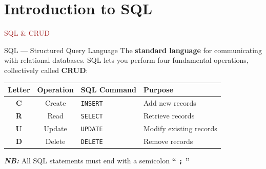 
\section{Introduction to SQL}

\begin{frame}{\textcolor{brown}{SQL \& CRUD}}
  \begin{block}{SQL — Structured Query Language}
    The \textbf{standard language} for communicating with relational databases.
    SQL lets you perform four fundamental operations, collectively called \textbf{CRUD}:
  \end{block}

  \vspace{0.5em}
  \begin{center}
    \renewcommand{\arraystretch}{1.3}
    \begin{tabular}{ccll}
      \toprule
      \textbf{Letter} & \textbf{Operation} & \textbf{SQL Command} & \textbf{Purpose} \\
      \midrule
      \textbf{C} & Create & \texttt{INSERT}  & Add new records \\
      \textbf{R} & Read   & \texttt{SELECT}  & Retrieve records \\
      \textbf{U} & Update & \texttt{UPDATE}  & Modify existing records \\
      \textbf{D} & Delete & \texttt{DELETE}  & Remove records \\
      \bottomrule
    \end{tabular}
  \end{center}

  \vspace{0.5em}
\emph{\textbf{NB: }}All SQL statements must end with a semicolon \textbf{`` \texttt{;} ''}
\end{frame}

